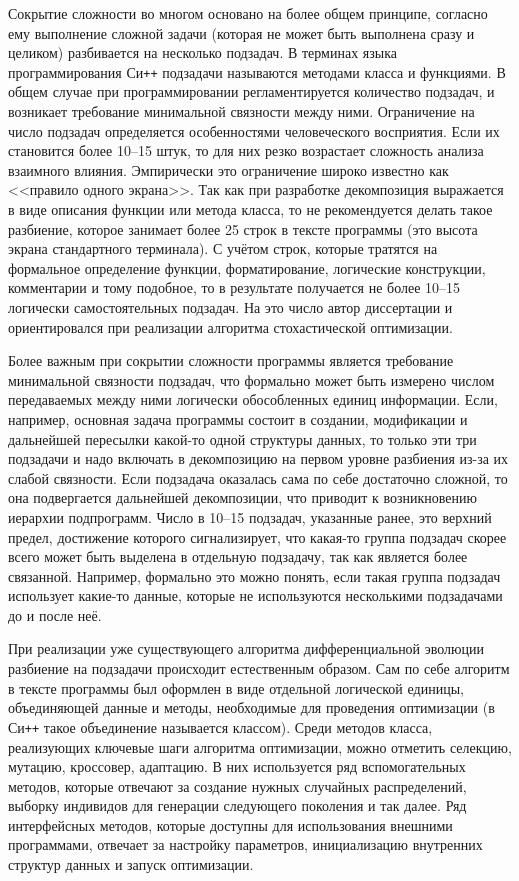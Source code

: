 Сокрытие сложности во многом основано на более общем принципе,
согласно ему выполнение сложной задачи (которая не может быть
выполнена сразу и целиком) разбивается на несколько подзадач. В
терминах языка программирования Си\texttt{++} подзадачи называются
методами класса и функциями.  В общем случае при программировании
регламентируется количество подзадач, и возникает требование
минимальной связности между ними.  Ограничение на число подзадач
определяется особенностями человеческого восприятия. Если их 
становится более 10--15 штук, то для них резко возрастает сложность анализа 
взаимного влияния.  Эмпирически это ограничение широко известно как
<<правило одного экрана>>.  Так как при разработке декомпозиция
выражается в виде описания функции или метода класса, то не
рекомендуется делать такое разбиение, которое занимает более 25 строк
в тексте программы (это высота экрана стандартного
терминала).  С учётом строк, которые тратятся на формальное определение
функции, форматирование, логические конструкции, комментарии и тому
подобное, то в результате получается не более 10--15 логически
самостоятельных подзадач. На это число автор диссертации и
ориентировался при реализации алгоритма стохастической оптимизации.


Более важным при сокрытии сложности программы является требование
минимальной связности подзадач, что формально может быть
измерено числом передаваемых между ними логически обособленных единиц информации.
Если, например, основная задача программы
состоит в создании, модификации и дальнейшей пересылки какой-то одной
структуры данных, то только эти три подзадачи и надо включать в
декомпозицию на первом уровне разбиения из-за их слабой связности. Если
подзадача оказалась сама по себе достаточно сложной, то она
подвергается дальнейшей декомпозиции, что приводит к возникновению
иерархии подпрограмм.  Число в 10--15 подзадач, указанные ранее, это
верхний предел, достижение которого сигнализирует, что какая-то
группа подзадач скорее всего может быть выделена в отдельную подзадачу,
так как является более связанной. Например, формально это можно
понять, если такая группа подзадач использует какие-то данные, которые
не используются несколькими подзадачами до и после неё.

При реализации уже существующего алгоритма дифференциальной эволюции
разбиение на подзадачи происходит естественным образом. Сам по себе
алгоритм в тексте программы был оформлен в виде отдельной логической
единицы, объединяющей  данные и методы, необходимые
для проведения оптимизации (в Си\texttt{++} такое
объединение называется классом). Среди методов класса, реализующих
ключевые шаги алгоритма оптимизации, можно отметить селекцию, мутацию,
кроссовер, адаптацию. В них используется ряд вспомогательных методов,
которые отвечают за создание нужных случайных распределений, выборку
индивидов для генерации следующего поколения и так далее. Ряд
интерфейсных методов, которые доступны для использования внешними
программами, отвечает за настройку параметров,
инициализацию внутренних структур данных и запуск оптимизации.

